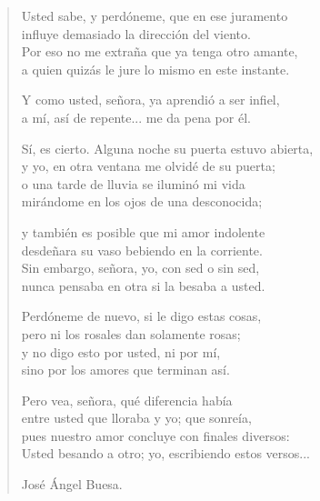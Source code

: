 \documentclass[11pt, portrait, twoside, notitlepage, openright]{book}
\begin{document}
\begin{verse}
Usted sabe, y perdóneme, que en ese juramento\\
influye demasiado la dirección del viento.\\
Por eso no me extraña que ya tenga otro amante,\\
a quien quizás le jure lo mismo en este instante.
\newline

Y como usted, señora, ya aprendió a ser infiel,\\
a mí, así de repente... me da pena por él.
\newline

Sí, es cierto. Alguna noche su puerta estuvo abierta,\\
y yo, en otra ventana me olvidé de su puerta;\\
o una tarde de lluvia se iluminó mi vida\\
mirándome en los ojos de una desconocida;
\newpage

y también es posible que mi amor indolente\\
desdeñara su vaso bebiendo en la corriente.\\
Sin embargo, señora, yo, con sed o sin sed,\\
nunca pensaba en otra si la besaba a usted.
\newline

Perdóneme de nuevo, si le digo estas cosas,\\
pero ni los rosales dan solamente rosas;\\
y no digo esto por usted, ni por mí,\\
sino por los amores que terminan así.
\newline

Pero vea, señora, qué diferencia había\\
entre usted que lloraba y yo; que sonreía,\\
pues nuestro amor concluye con finales diversos:\\
Usted besando a otro; yo, escribiendo estos versos...
\newline

José Ángel Buesa.
\end{verse}
\end{document}
